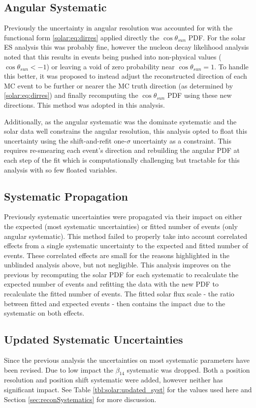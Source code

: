 \subsection{Angular Systematic}
Previously the uncertainty in angular resolution was accounted for with the functional form  \ref{solar:eq:dirres} applied directly the $\cos \theta_{sun}$ PDF. 
For the solar ES analysis this was probably fine, however the nucleon decay likelihood analysis noted that this results in events being pushed into non-physical values ($\cos \theta_{sun} < -1$) or leaving a void of zero probability near $\cos \theta_{sun} = 1$.
To handle this better, it was proposed to instead adjust the reconstructed direction of each MC event to be further or nearer the MC truth direction (as determined by  \ref{solar:eq:dirres}) and finally recomputing the $\cos \theta_{sun}$ PDF using these new directions.
This method was adopted in this analysis.

Additionally, as the angular systematic was the dominate systematic and the solar data well constrains the angular resolution, this analysis opted to float this uncertainty using the shift-and-refit one-$\sigma$ uncertainty as a constraint.
This requires re-smearing each event's direction and rebuilding the angular PDF at each step of the fit which is computationally challenging but tractable for this analysis with so few floated variables.

\subsection{Systematic Propagation}
Previously systematic uncertainties were propagated via their impact on either the expected (most systematic uncertainties) or fitted number of events (only angular systematic). 
This method failed to properly take into account correlated effects from a single systematic uncertainty to the expected and fitted number of events.
These correlated effects are small for the reasons highlighted in the unblinded analysis above, but not negligible.
This analysis improves on the previous by recomputing the solar PDF for each systematic to recalculate the expected number of events and refitting the data with the new PDF to recalculate the fitted number of events.
The fitted solar flux scale - the ratio between fitted and expected events - then contains the impact due to the systematic on both effects.

\subsection{Updated Systematic Uncertainties}
Since the previous analysis the uncertainties on most systematic parameters have been revised. 
Due to low impact the $\beta_{14}$ systematic was dropped.
Both a position resolution and position shift systematic were added, however neither has significant impact.
See Table \ref{tbl:solar:updated_syst} for the values used here and Section \ref{sec:reconSystematics} for more discussion.

